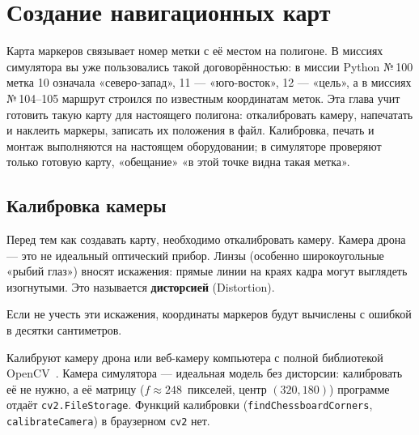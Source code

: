 \section{Создание навигационных карт}
\label{sec:python-map-creation}

Карта маркеров связывает номер метки с её местом на полигоне. В миссиях симулятора вы уже пользовались такой договорённостью: в миссии Python №\,100 метка 10 означала «северо-запад», 11 --- «юго-восток», 12 --- «цель», а в миссиях №\,104--105 маршрут строился по известным координатам меток. Эта глава учит готовить такую карту для настоящего полигона: откалибровать камеру, напечатать и наклеить маркеры, записать их положения в файл. Калибровка, печать и монтаж выполняются на настоящем оборудовании; в симуляторе проверяют только готовую карту, «обещание» «в этой точке видна такая метка».

\subsection{Калибровка камеры}
Перед тем как создавать карту, необходимо откалибровать камеру. Камера дрона — это не идеальный оптический прибор. Линзы (особенно широкоугольные «рыбий глаз») вносят искажения: прямые линии на краях кадра могут выглядеть изогнутыми. Это называется \textbf{дисторсией} (Distortion).

Если не учесть эти искажения, координаты маркеров будут вычислены с ошибкой в десятки сантиметров.

\begin{infobox}
Калибруют камеру дрона или веб-камеру компьютера с полной библиотекой OpenCV~\cite{opencv_calibration}. Камера симулятора --- идеальная модель без дисторсии: калибровать её не нужно, а её матрицу ($f \approx 248$~пикселей, центр $(320, 180)$) программе отдаёт \verb|cv2.FileStorage|. Функций калибровки (\verb|findChessboardCorners|, \verb|calibrateCamera|) в браузерном \verb|cv2| нет.
\end{infobox}

